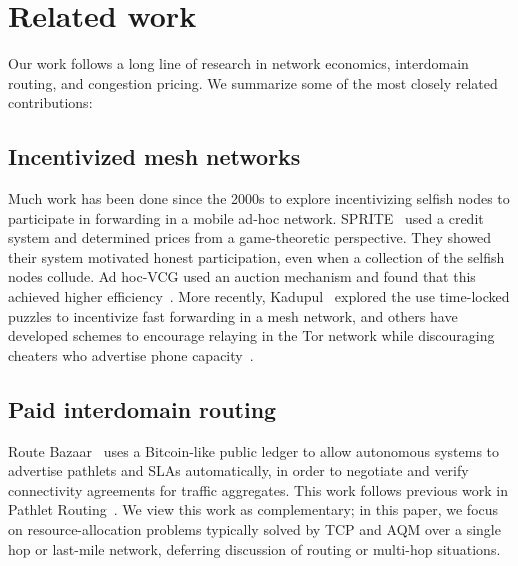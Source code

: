\section{Related work}
\label{sec:related}

Our work follows a long line of research in network economics,
interdomain routing, and congestion pricing.  We summarize some of the
most closely related contributions:

\subsection{Incentivized mesh networks}
Much work has been done since the 2000s to explore incentivizing selfish nodes to participate in forwarding in a mobile ad-hoc network.
SPRITE~\cite{zhong03} used a credit system and determined prices from a game-theoretic perspective. They showed their system motivated honest participation, even when a collection of the selfish nodes collude. Ad hoc-VCG used an auction mechanism
and found that this achieved higher efficiency~\cite{anderegg03}. More recently, Kadupul~\cite{kadupul15} explored the use time-locked puzzles to incentivize fast forwarding in a mesh network,
and others have developed schemes to encourage relaying in the Tor network while discouraging cheaters who
advertise phone capacity~\cite{torpath14, onions14}.

\subsection{Paid interdomain routing}

Route Bazaar~\cite{routebazaar15} uses a Bitcoin-like public ledger to
allow autonomous systems to advertise pathlets and SLAs
automatically, in order to negotiate and verify connectivity
agreements for traffic aggregates. This work follows previous work in
Pathlet Routing~\cite{pathlet09}. We view this work as complementary;
in this paper, we focus on resource-allocation problems typically
solved by TCP and AQM over a single hop or last-mile network,
deferring discussion of routing or multi-hop situations.

